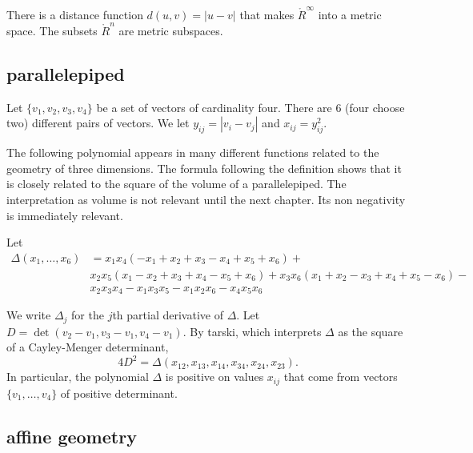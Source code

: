 There is a distance function $d(u,v) = | u - v|$ that makes
$\ring{R}^\infty$ into a metric space.  The subsets $\ring{R}^n$ are
metric subspaces.






\subsection{parallelepiped}

Let $\{v_1,v_2,v_3,v_4\}$ be a set of vectors of cardinality four.
There are $6$ (four choose two) different pairs of vectors. We let
$y_{ij} = |v_i-v_j|$ and $x_{ij}=y_{ij}^2$.

The following polynomial appears in many different functions related to the geometry of three dimensions.  The formula following the definition shows that it is closely related to the square of the volume of a parallelepiped.  The interpretation as  volume is not relevant until the next chapter.  Its non negativity is immediately relevant. 

\begin{definition}[$\Delta$]\label{def:delta}  Let 
$$
\begin{array}{lll}
\Delta(x_1,\ldots,x_6) &= x_1 x_4 (- x_1+x_2+x_3- x_4+x_5+x_6)+\\&
            x_2 x_5 (x_1- x_2+x_3+x_4- x_5+x_6)
            +x_3 x_6 (x_1+x_2- x_3+x_4+x_5- x_6)
            - \\&x_2 x_3 x_4- x_1 x_3 x_5- x_1 x_2 x_6- x_4 x_5 x_6
\end{array}
$$
\end{definition}

We write $\Delta_j$ for the $j$th partial derivative of $\Delta$. 
Let $D = \det(v_2-v_1,v_3-v_1,v_4-v_1)$.
By tarski, which interprets $\Delta$
as the square of a Cayley-Menger determinant,%
  $$
  4 D^2 = \Delta(x_{12},x_{13},x_{14},x_{34},x_{24},x_{23}).
  $$
In particular, the polynomial $\Delta$ is positive on values $x_{ij}$
that come from vectors $\{v_1,\ldots,v_4\}$ of positive determinant.





\subsection{affine geometry}


